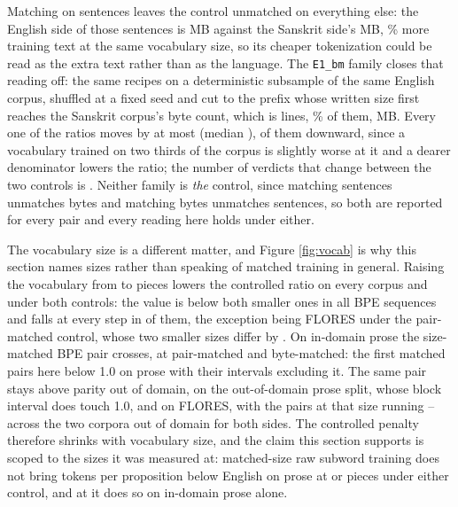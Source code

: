 \documentclass[11pt]{article}
\begin{document}
Matching on sentences leaves the control unmatched on everything else: the English side of
those sentences is \numBytesEnglishTrain{} MB against the Sanskrit side's
\numBytesSanskritTrain{} MB, \numBytesEnglishExcessPct\%{} more training text at the same
vocabulary size, so its cheaper tokenization could be read as the extra text rather than as
the language. The \texttt{E1\_bm} family closes that reading off: the same recipes on a
deterministic subsample of the same English corpus, shuffled at a fixed seed and cut to the
prefix whose written size first reaches the Sanskrit corpus's byte count, which is
\numBmLines{} lines, \numBmLinePct\%{} of them, \numBytesEnglishBmTrain{} MB. Every one of
the \numBmMoveCount{} ratios moves by at most \numBmMaxMove{} (median \numBmMedianMove),
\numBmDownwardCount{} of them downward, since a vocabulary trained on two thirds of the
corpus is slightly worse at it and a dearer denominator lowers the ratio; the number of
verdicts that change between the two controls is \numBmVerdictChanges. Neither family is
\emph{the} control, since matching sentences unmatches bytes and matching bytes unmatches
sentences, so both are reported for every pair and every reading here holds under either.

The vocabulary size is a different matter, and Figure \ref{fig:vocab} is why this section
names sizes rather than speaking of matched training in general. Raising the vocabulary
from \numVocabSmall{} to \numVocabHuge{} pieces lowers the controlled ratio on every corpus
and under both controls: the \numVocabHuge{} value is below both smaller ones in all
\numBpeSequencesTotal{} BPE sequences and falls at every step in
\numBpeMonotoneSequences{} of them, the exception being FLORES under the pair-matched
control, whose two smaller sizes differ by \numBpeFloresStepGap. On in-domain prose the
size-matched BPE pair crosses, at \numTppBpeHugeSamayik{} \numTppBpeHugeSamayikCi{}
pair-matched and \numTppBpeHugeSamayikBm{} \numTppBpeHugeSamayikBmCi{} byte-matched: the
first matched pairs here below 1.0 on prose with their intervals excluding it. The same
pair stays above parity out of domain, \numTppBpeHugeOod{} \numTppBpeHugeOodCi{} on the
out-of-domain prose split, whose block interval \numTppBpeHugeOodBlockCi{} does touch 1.0,
and \numTppBpeHugeFlores{} on FLORES, with the \numControlledPairsHuge{} pairs at that size
running \numTppControlledHugeOodLo--\numTppControlledHugeOodHi{} across the two corpora out
of domain for both sides. The controlled penalty therefore shrinks with vocabulary size,
and the claim this section supports is scoped to the sizes it was measured at:
matched-size raw subword training does not bring tokens per proposition below English on
prose at \numVocabSmall{} or \numVocabLarge{} pieces under either control, and at
\numVocabHuge{} it does so on in-domain prose alone.
\end{document}
